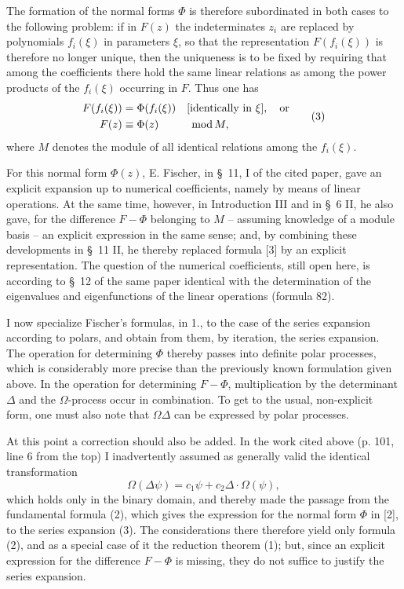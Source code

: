 \documentclass[11pt]{article}
\providecommand{\modu}[1]{\;\operatorname{mod} #1}
\begin{document}
The formation of the normal forms $\Phi$ is therefore subordinated in both cases to the following problem: if in $F(z)$ the indeterminates $z_i$ are replaced by polynomials $f_i(\xi)$ in parameters $\xi$, so that the representation $F(f_i(\xi))$ is therefore no longer unique, then the uniqueness is to be fixed by requiring that among the coefficients there hold the same linear relations as among the power products of the $f_i(\xi)$ occurring in $F$. Thus one has
\begin{equation}
\begin{aligned}
        F(f_i(\xi))&=\Phi(f_i(\xi))&&[\text{identically in }\xi],\quad\text{or}\notag\\
        F(z)&\equiv\Phi(z)&&\modu{M},
\end{aligned}
\tag{3}
\end{equation}
where $M$ denotes the module of all identical relations among the $f_i(\xi)$.

For this normal form $\Phi(z)$, E. Fischer, in \S~11, I of the cited paper, gave an explicit expansion up to numerical coefficients, namely by means of linear operations. At the same time, however, in Introduction III and in \S~6 II, he also gave, for the difference $F-\Phi$ belonging to $M$ -- assuming knowledge of a module basis -- an explicit expression in the same sense; and, by combining these developments in \S~11 II, he thereby replaced formula [3] by an explicit representation. The question of the numerical coefficients, still open here, is according to \S~12 of the same paper identical with the determination of the eigenvalues and eigenfunctions of the linear operations (formula 82).

I now specialize Fischer's formulas, in 1., to the case of the series expansion according to polars, and obtain from them, by iteration, the series expansion. The operation for determining $\Phi$ thereby passes into definite polar processes, which is considerably more precise than the previously known formulation given above. In the operation for determining $F-\Phi$, multiplication by the determinant $\Delta$ and the $\Omega$-process occur in combination. To get to the usual, non-explicit form, one must also note that $\Omega\Delta$ can be expressed by polar processes.

At this point a correction should also be added. In the work cited above (p. 101, line 6 from the top) I inadvertently assumed as generally valid the identical transformation
\[
        \Omega(\Delta\psi)=c_1\psi+c_2\Delta\cdot\Omega(\psi),
\]
which holds only in the binary domain, and thereby made the passage from the fundamental formula (2), which gives the expression for the normal form $\Phi$ in [2], to the series expansion (3). The considerations there therefore yield only formula (2), and as a special case of it the reduction theorem (1); but, since an explicit expression for the difference $F-\Phi$ is missing, they do not suffice to justify the series expansion.
\end{document}
